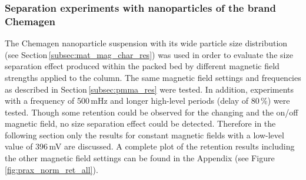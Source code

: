 \subsubsection{Separation experiments with nanoparticles of the brand Chemagen}
\label{subsubsec:chemagen_res}
The Chemagen nanoparticle suspension with its wide particle size distribution (see Section\,\ref{subsec:mat_mag_char_res}) was used in order to evaluate the size separation effect produced within the packed bed by different magnetic field strengths applied to the column. The same magnetic field settings and frequencies as described in Section\,\ref{subsec:pmma_res} were tested. In addition, experiments with a frequency of 500\,mHz and longer high-level periods (delay of 80\,\%) were tested. Though some retention could be observed for the changing and the on/off magnetic field, no size separation effect could be  detected. Therefore in the following section only the results for constant magnetic fields with a low-level value of 396\,mV are discussed. A complete plot of the retention results including the other magnetic field settings can be found in the Appendix (see Figure\,\ref{fig:prax_norm_ret_all}).

